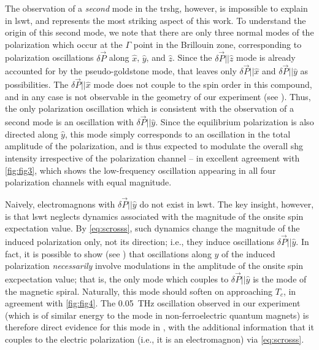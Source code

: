 The observation of a \emph{second} mode in the \gls{trshg}, however, is impossible to explain in \gls{lswt}, and represents the most striking aspect of this work.
To understand the origin of this second mode, we note that there are only three normal modes of the polarization which occur at the $\Gamma$ point in the Brillouin zone, corresponding to polarization oscillations $\delta\vec{P}$ along $\hat{x}$, $\hat{y}$, and $\hat{z}$.
Since the $\delta\vec{P} || \hat{z}$ mode is already accounted for by the pseudo-goldstone mode, that leaves only $\delta\vec{P} || \hat{x}$ and $\delta\vec{P} || \hat{y}$ as possibilities.
The $\delta\vec{P} || \hat{x}$ mode does not couple to the spin order in this compound\cite{katsura_dynamical_2007}, and in any case is not observable in the geometry of our experiment (see ).
Thus, the only polarization oscillation which is consistent with the observation of a second mode is an oscillation with $\delta\vec{P} || \hat{y}$.
Since the equilibrium polarization is also directed along $\hat{y}$, this mode simply corresponds to an oscillation in the total amplitude of the polarization, and is thus expected to modulate the overall \gls{shg} intensity irrespective of the polarization channel -- in excellent agreement with \cref{fig:fig3}, which shows the low-frequency oscillation appearing in all four polarization channels with equal magnitude.

Naively, electromagnons with $\delta\vec{P} || \hat{y}$ do not exist in \gls{lswt}.
The key insight, however, is that \gls{lswt} neglects dynamics associated with the magnitude of the onsite spin expectation value.
By \cref{eq:scrosss}, such dynamics change the magnitude of the induced polarization only, not its direction; i.e., they induce oscillations $\delta\vec{P} || \hat{y}$.
In fact, it is possible to show (see ) that oscillations along $\hat{y}$ of the induced polarization \emph{necessarily} involve modulations in the amplitude of the onsite spin excpectation value; that is, the only mode which couples to $\delta\vec{P} || \hat{y}$ is the \higgs mode of the magnetic spiral.
Naturally, this mode should soften on approaching $T_c$, in agreement with \cref{fig:fig4}.
The \qty{0.05}{THz} oscillation observed in our experiment (which is of similar energy to the \higgs mode in non-ferroelectric quantum magnets\citet{hong_higgs_2017}) is therefore direct evidence for this mode in , with the additional information that it couples to the electric polarization (i.e., it is an electromagnon) via \cref{eq:scrosss}.

